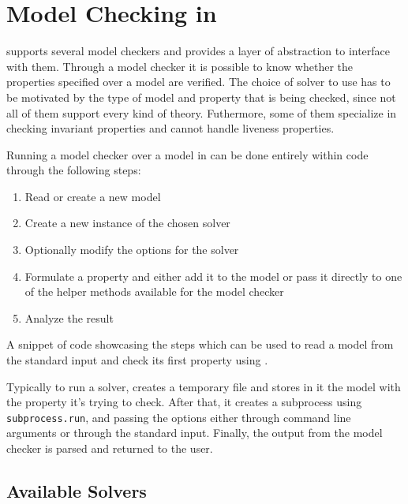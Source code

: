 \chapter{Model Checking in \pyvmt{}}
\label{ch:model-checking}
\pyvmt{} supports several model checkers and provides a layer of abstraction to interface with them. Through a model checker it is possible to know whether the properties specified over a model are verified.
The choice of solver to use has to be motivated by the type of model and property that is being checked, since not all of them support every kind of theory.
Futhermore, some of them specialize in checking invariant properties and cannot handle liveness properties.

Running a model checker over a model in \pyvmt{} can be done entirely within \python{} code through the following steps:
\begin{enumerate}
    \item Read or create a new model
    \item Create a new instance of the chosen solver
    \item Optionally modify the options for the solver
    \item Formulate a property and either add it to the model or pass it directly to one of the helper methods available for the model checker
    \item Analyze the result
\end{enumerate}

\begin{listing}[h]
    \label{alg:model-checking-steps}
    \caption{A snippet of code showcasing the steps which can be used to read a model from the standard input and check its first property using \iceia{}.}
\end{listing}

Typically to run a solver, \pyvmt{} creates a temporary file and stores in it the model with the property it's trying to check.
After that, it creates a subprocess using \texttt{subprocess.run}, and passing the options either through command line arguments or through the standard input.
Finally, the output from the model checker is parsed and returned to the user.

\section{Available Solvers}

